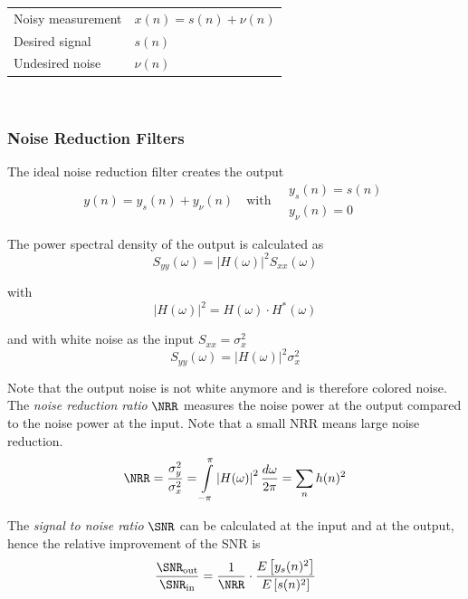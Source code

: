 \begin{tabularx}{\linewidth}{lX}
	Noisy measurement & $x(n) = s(n) + \nu(n)$ \\
	Desired signal & $s(n)$ \\
	Undesired noise & $\nu(n)$ \\
\end{tabularx} \\

\subsubsection{Noise Reduction Filters}

The ideal noise reduction filter creates the output
\begin{equation*}
	y(n) = y_s(n) + y_{\nu}(n) \quad \text{with} \quad
		\begin{array}{l}
		y_s(n) = s(n) \\
		y_{\nu}(n) = 0
		\end{array}
\end{equation*}

The power spectral density of the output is calculated as
\begin{equation*}
	S_{yy}(\omega) = \left| H(\omega) \right|^2 S_{xx}(\omega)
\end{equation*}

with
\begin{equation*}
	\left| H(\omega) \right|^2 = H(\omega) \cdot H^*(\omega)
\end{equation*}

and with white noise as the input $S_{xx} = \sigma_x^2$
\begin{equation*}
	S_{yy}(\omega) = \left| H(\omega) \right|^2 \sigma_x^2
\end{equation*}

Note that the output noise is not white anymore and is therefore colored noise. \\

The \emph{noise reduction ratio} $\NRR$ measures the noise power at the output
compared to the noise power at the input. Note that a small NRR means
large noise reduction.
\begin{equation*}
	\NRR = \frac{\sigma_y^2}{\sigma_x^2}
		 = \int\limits_{-\pi}^{\pi} \left| H(\omega) \right|^2 \frac{d\omega}{2\pi}
		 = \sum\limits_{n} h(n)^2
\end{equation*}

The \emph{signal to noise ratio} $\SNR$ can be calculated at the input and
at the output, hence the relative improvement of the SNR is
\begin{equation*}
	\frac{\SNR_{\text{out}}}{\SNR_{\text{in}}} = \frac{1}{\NRR} \cdot \frac{E\left[y_s(n)^2\right]}{E\left[s(n)^2\right]}
\end{equation*}

